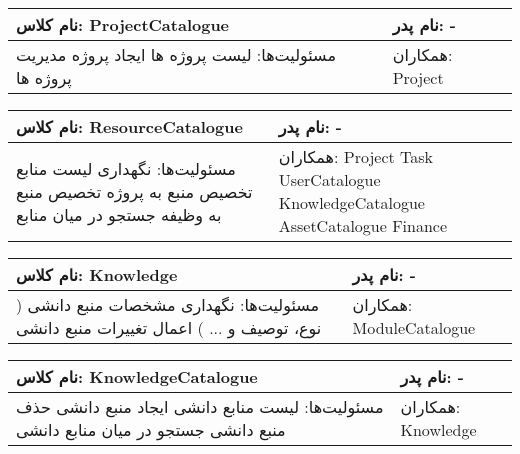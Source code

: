 \begin{tabular}{|p{6cm}|p{6cm}|}
\hline
نام کلاس: ProjectCatalogue
&
نام پدر: -
\\
\hline
مسئولیت‌ها:
\newline
لیست پروژه ها
\newline
ایجاد پروژه
\newline
مدیریت پروژه ها 
&
همکاران:
\newline
 Project
\\
\hline
\end{tabular}
\vspace{1cm}


\begin{tabular}{|p{6cm}|p{6cm}|}
\hline
نام کلاس: ResourceCatalogue
&
نام پدر: -
\\
\hline
مسئولیت‌ها:
\newline
نگهداری لیست منابع
\newline
تخصیص منبع به پروژه
\newline
تخصیص منبع به وظیفه
\newline
جستجو در میان منابع

&
همکاران:
\newline
Project
\newline
Task
\newline
UserCatalogue
\newline
KnowledgeCatalogue
\newline
AssetCatalogue
\newline
Finance
\\
\hline
\end{tabular}
\vspace{1cm}

\begin{tabular}{|p{6cm}|p{6cm}|}
\hline
نام کلاس: Knowledge
&
نام پدر: -
\\
\hline
مسئولیت‌ها:
\newline
نگهداری مشخصات منبع دانشی ( نوع، توصیف و ... )
\newline
اعمال تغییرات منبع دانشی

&
همکاران:
\newline
ModuleCatalogue
\\
\hline
\end{tabular}
\vspace{1cm}

\begin{tabular}{|p{6cm}|p{6cm}|}
\hline
نام کلاس: KnowledgeCatalogue
&
نام پدر: -
\\
\hline
مسئولیت‌ها:
\newline
لیست منابع دانشی
\newline
ایجاد منبع دانشی 
\newline
حذف منبع دانشی
\newline
جستجو در میان منابع دانشی
&
همکاران:
\newline
Knowledge
\\
\hline
\end{tabular}
\vspace{1cm}

